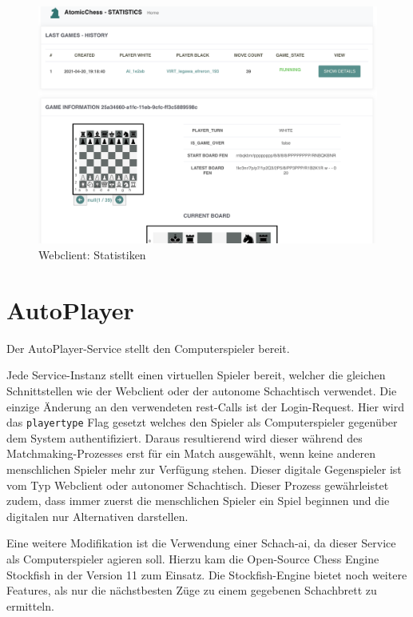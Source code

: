 \begin{figure}
\centering
\includegraphics{images/ATC_statistics.png}
\caption{Webclient: Statistiken \label{ATC_statistics}}
\end{figure}

\hypertarget{autoplayer}{%
\section{AutoPlayer}\label{autoplayer}}

Der AutoPlayer-Service stellt den Computerspieler bereit.

Jede Service-Instanz stellt einen virtuellen Spieler bereit, welcher die
gleichen Schnittstellen wie der Webclient oder der autonome Schachtisch
verwendet. Die einzige Änderung an den verwendeten \gls{rest}-Calls ist
der Login-Request. Hier wird das \passthrough{\lstinline!playertype!}
Flag gesetzt welches den Spieler als Computerspieler gegenüber dem
System authentifiziert. Daraus resultierend wird dieser während des
Matchmaking-Prozesses erst für ein Match ausgewählt, wenn keine anderen
menschlichen Spieler mehr zur Verfügung stehen. Dieser digitale
Gegenspieler ist vom Typ Webclient oder autonomer Schachtisch. Dieser
Prozess gewährleistet zudem, dass immer zuerst die menschlichen Spieler
ein Spiel beginnen und die digitalen nur Alternativen darstellen.

Eine weitere Modifikation ist die Verwendung einer Schach-\gls{ai}, da
dieser Service als Computerspieler agieren soll. Hierzu kam die
Open-Source Chess Engine Stockfish\cite{stockfish} in der Version 11
zum Einsatz. Die Stockfish-Engine bietet noch weitere Features, als nur
die nächstbesten Züge zu einem gegebenen Schachbrett zu ermitteln.

